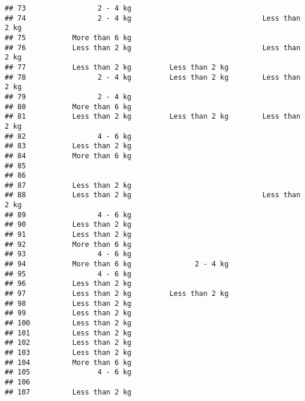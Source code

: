 \documentclass[
]{article}
\begin{document}
\begin{verbatim}
## 73                 2 - 4 kg                                             
## 74                 2 - 4 kg                               Less than 2 kg
## 75           More than 6 kg                                             
## 76           Less than 2 kg                               Less than 2 kg
## 77           Less than 2 kg         Less than 2 kg                      
## 78                 2 - 4 kg         Less than 2 kg        Less than 2 kg
## 79                 2 - 4 kg                                             
## 80           More than 6 kg                                             
## 81           Less than 2 kg         Less than 2 kg        Less than 2 kg
## 82                 4 - 6 kg                                             
## 83           Less than 2 kg                                             
## 84           More than 6 kg                                             
## 85                                                                      
## 86                                                                      
## 87           Less than 2 kg                                             
## 88           Less than 2 kg                               Less than 2 kg
## 89                 4 - 6 kg                                             
## 90           Less than 2 kg                                             
## 91           Less than 2 kg                                             
## 92           More than 6 kg                                             
## 93                 4 - 6 kg                                             
## 94           More than 6 kg               2 - 4 kg                      
## 95                 4 - 6 kg                                             
## 96           Less than 2 kg                                             
## 97           Less than 2 kg         Less than 2 kg                      
## 98           Less than 2 kg                                             
## 99           Less than 2 kg                                             
## 100          Less than 2 kg                                             
## 101          Less than 2 kg                                             
## 102          Less than 2 kg                                             
## 103          Less than 2 kg                                             
## 104          More than 6 kg                                             
## 105                4 - 6 kg                                             
## 106                                                                     
## 107          Less than 2 kg                                             

\end{verbatim}
\end{document}
